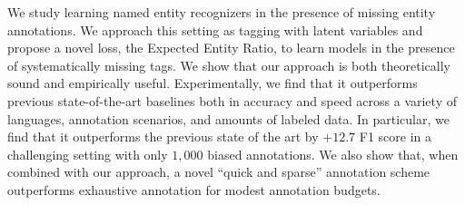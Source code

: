 We study learning named entity recognizers in the presence of missing entity annotations. We approach this setting as tagging with latent variables and propose a novel loss, the Expected Entity Ratio, to learn models in the presence of systematically missing tags. We show that our approach is both theoretically sound and empirically useful. Experimentally, we find that it outperforms previous state-of-the-art baselines both in accuracy and speed across a variety of languages, annotation scenarios, and amounts of labeled data. In particular, we find that it outperforms the previous state of the art by $+12.7$ F1 score in a challenging setting with only $1,000$ biased annotations. We also show that, when combined with our approach, a novel ``quick and sparse'' annotation scheme outperforms exhaustive annotation for modest annotation budgets.